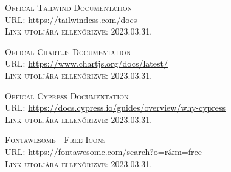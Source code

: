 \documentclass[
]{thesis-ekf}
\theoremstyle{definition}
\theoremstyle{remark}
\begin{document}
\begin{thebibliography}{20}
		\textsc{Offical Tailwind Documentation}\\
		\textsc{URL:} \url{https://tailwindcss.com/docs}\\
		\textsc{Link utoljára ellenőrizve:} 2023.03.31.
		
		\textsc{Offical Chart.js Documentation}\\
		\textsc{URL:} \url{https://www.chartjs.org/docs/latest/}\\
		\textsc{Link utoljára ellenőrizve:} 2023.03.31.
			
		\textsc{Offical Cypress Documentation}\\
		\textsc{URL:} \url{https://docs.cypress.io/guides/overview/why-cypress}\\
		\textsc{Link utoljára ellenőrizve:} 2023.03.31.
		
		\textsc{Fontawesome - Free Icons}\\
		\textsc{URL:} \url{https://fontawesome.com/search?o=r&m=free}\\
		\textsc{Link utoljára ellenőrizve:} 2023.03.31.
				
	\end{thebibliography}
	
	
\end{document}
